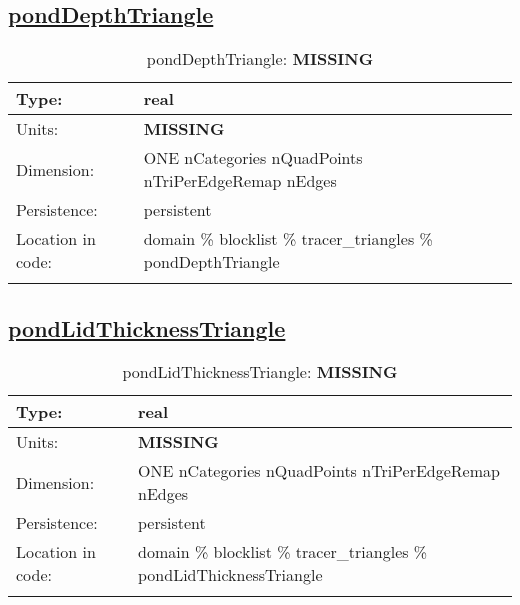 \subsection[pondDepthTriangle]{\hyperref[sec:var_tab_tracer_triangles]{pondDepthTriangle}}
\label{subsec:var_sec_tracer_triangles_pondDepthTriangle}
\begin{center}
\begin{longtable}{| p{2.0in} | p{4.0in} |}
        \hline 
        Type: & real \\
        \hline 
        Units: & {\bf \color{red} MISSING} \\
        \hline 
        Dimension: & ONE nCategories nQuadPoints nTriPerEdgeRemap nEdges \\
        \hline 
        Persistence: & persistent \\
        \hline 
         Location in code: & domain \% blocklist \% tracer\_triangles \% pondDepthTriangle \\
         \hline 
    \caption{pondDepthTriangle: {\bf \color{red} MISSING}}
\end{longtable}
\end{center}
\subsection[pondLidThicknessTriangle]{\hyperref[sec:var_tab_tracer_triangles]{pondLidThicknessTriangle}}
\label{subsec:var_sec_tracer_triangles_pondLidThicknessTriangle}
\begin{center}
\begin{longtable}{| p{2.0in} | p{4.0in} |}
        \hline 
        Type: & real \\
        \hline 
        Units: & {\bf \color{red} MISSING} \\
        \hline 
        Dimension: & ONE nCategories nQuadPoints nTriPerEdgeRemap nEdges \\
        \hline 
        Persistence: & persistent \\
        \hline 
         Location in code: & domain \% blocklist \% tracer\_triangles \% pondLidThicknessTriangle \\
         \hline 
    \caption{pondLidThicknessTriangle: {\bf \color{red} MISSING}}
\end{longtable}
\end{center}
